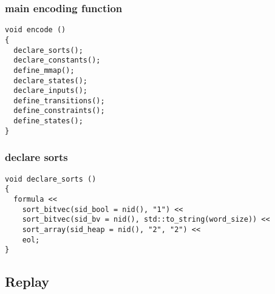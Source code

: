 \subsubsection{main encoding function}

\begin{lstlisting}[style=c++]
void encode ()
{
  declare_sorts();
  declare_constants();
  define_mmap();
  declare_states();
  declare_inputs();
  define_transitions();
  define_constraints();
  define_states();
}
\end{lstlisting}

\subsubsection{declare sorts}

\begin{lstlisting}[style=c++]
void declare_sorts ()
{
  formula <<
    sort_bitvec(sid_bool = nid(), "1") <<
    sort_bitvec(sid_bv = nid(), std::to_string(word_size)) <<
    sort_array(sid_heap = nid(), "2", "2") <<
    eol;
}
\end{lstlisting}

\subsection{Replay}

